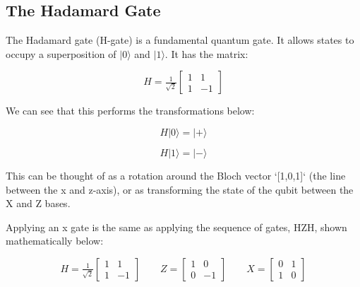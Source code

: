 \subsection{The Hadamard Gate}
The Hadamard gate (H-gate) is a fundamental quantum gate. It allows states to occupy a superposition of $|0\rangle$ and $|1\rangle$. It has the matrix:

$$ H = \tfrac{1}{\sqrt{2}}\begin{bmatrix} 1 & 1 \\ 1 & -1 \end{bmatrix} $$

We can see that this performs the transformations below:

$$ H|0\rangle = |+\rangle $$

$$ H|1\rangle = |-\rangle $$

This can be thought of as a rotation around the Bloch vector `[1,0,1]` (the line between the x and z-axis), or as transforming the state of the qubit between the X and Z bases.

Applying an x gate is the same as applying the sequence of gates, HZH, shown mathematically below:

$$ H = \tfrac{1}{\sqrt{2}}\begin{bmatrix} 1 & 1 \\ 1 & -1 \end{bmatrix} \quad\quad  Z = \begin{bmatrix} 1 & 0 \\ 0 & -1 \end{bmatrix} \quad\quad  X = \begin{bmatrix} 0 & 1 \\ 1 & 0 \end{bmatrix} $$

